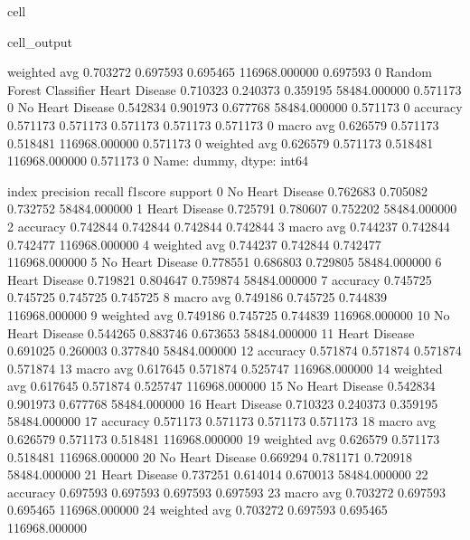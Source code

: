 \documentclass[letterpaper,10pt,english]{jupyterBook}
\begin{document}
\begin{sphinxuseclass}{cell}
\begin{sphinxVerbatimOutput}
\begin{sphinxuseclass}{cell_output}
\begin{sphinxVerbatim}[commandchars=\\\{\}]
                           weighted avg      0.703272   0.697593  0.695465  116968.000000  0.697593    0
Random Forest Classifier   Heart Disease     0.710323   0.240373  0.359195  58484.000000   0.571173    0
                           No Heart Disease  0.542834   0.901973  0.677768  58484.000000   0.571173    0
                           accuracy          0.571173   0.571173  0.571173  0.571173       0.571173    0
                           macro avg         0.626579   0.571173  0.518481  116968.000000  0.571173    0
                           weighted avg      0.626579   0.571173  0.518481  116968.000000  0.571173    0
Name: dummy, dtype: int64
\end{sphinxVerbatim}

\begin{sphinxVerbatim}[commandchars=\\\{\}]
               index  precision    recall  f1\PYGZhy{}score        support  \PYGZbs{}
0   No Heart Disease   0.762683  0.705082  0.732752   58484.000000   
1      Heart Disease   0.725791  0.780607  0.752202   58484.000000   
2           accuracy   0.742844  0.742844  0.742844       0.742844   
3          macro avg   0.744237  0.742844  0.742477  116968.000000   
4       weighted avg   0.744237  0.742844  0.742477  116968.000000   
5   No Heart Disease   0.778551  0.686803  0.729805   58484.000000   
6      Heart Disease   0.719821  0.804647  0.759874   58484.000000   
7           accuracy   0.745725  0.745725  0.745725       0.745725   
8          macro avg   0.749186  0.745725  0.744839  116968.000000   
9       weighted avg   0.749186  0.745725  0.744839  116968.000000   
10  No Heart Disease   0.544265  0.883746  0.673653   58484.000000   
11     Heart Disease   0.691025  0.260003  0.377840   58484.000000   
12          accuracy   0.571874  0.571874  0.571874       0.571874   
13         macro avg   0.617645  0.571874  0.525747  116968.000000   
14      weighted avg   0.617645  0.571874  0.525747  116968.000000   
15  No Heart Disease   0.542834  0.901973  0.677768   58484.000000   
16     Heart Disease   0.710323  0.240373  0.359195   58484.000000   
17          accuracy   0.571173  0.571173  0.571173       0.571173   
18         macro avg   0.626579  0.571173  0.518481  116968.000000   
19      weighted avg   0.626579  0.571173  0.518481  116968.000000   
20  No Heart Disease   0.669294  0.781171  0.720918   58484.000000   
21     Heart Disease   0.737251  0.614014  0.670013   58484.000000   
22          accuracy   0.697593  0.697593  0.697593       0.697593   
23         macro avg   0.703272  0.697593  0.695465  116968.000000   
24      weighted avg   0.703272  0.697593  0.695465  116968.000000   


\end{sphinxVerbatim}
\end{sphinxuseclass}
\end{sphinxVerbatimOutput}
\end{sphinxuseclass}
\end{document}
